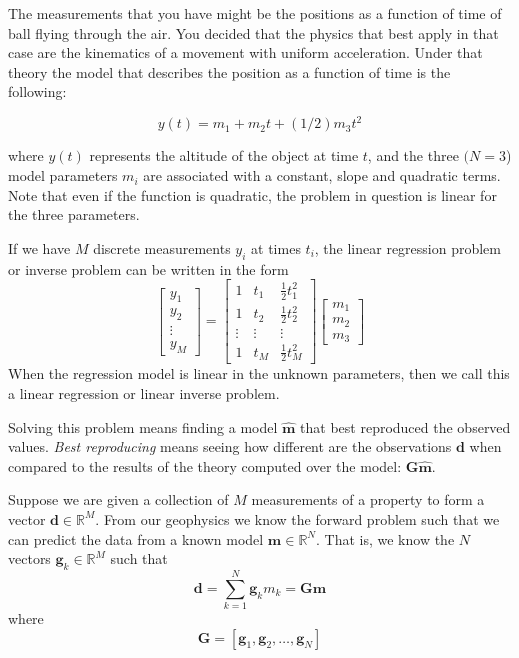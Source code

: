 \documentclass{article}
\newcommand{\real}{\mathbb{R}}
\begin{document}
The measurements that you have might be the positions as a function of time of ball flying through the air. You decided that the physics that best apply in that case are the kinematics of a movement with uniform acceleration. Under that theory the model that describes the position as a function of time is the following:

\begin{equation}
y(t) = m_1 + m_2 t + (1/2) m_3 t^2
\end{equation}

where $y(t)$ represents the altitude of the object at time $t$, and the three $(N=3$) model parameters $m_i$ are associated with a constant, slope and quadratic terms. Note that even if the function is quadratic, the problem in question is linear for the three parameters. 

If we have $M$ discrete measurements $y_i$ at times $t_i$, the linear regression problem or inverse problem can be written in the form
\begin{equation}
\left[
\begin{array}{c}
  y_1   \\
  y_2   \\
  \vdots \\
  y_M
\end{array}
\right] = 
\left[
\begin{array}{ccc}
  1 & t_1 & {\scriptstyle{\frac{1}{2}}}t_1^2 \\
  1  &t_2 &  {\scriptstyle{\frac{1}{2}}}t_2^2\\
  \vdots & \vdots  & \vdots\\
  1 & t_M &  {\scriptstyle{\frac{1}{2}}}t_M^2
\end{array}
\right]
\left[
\begin{array}{c}
  m_1   \\
  m_2    \\
  m_3
\end{array}
\right] 
\end{equation}
When the regression model is linear in the unknown parameters, then we call this a linear regression or linear inverse problem. 

Solving this problem means finding a model $\mathbf{\hat{m}}$ that best reproduced the observed values. \emph{Best reproducing} means seeing how different are the observations $\mathbf{d}$ when compared to the results of the theory computed over the model: $\mathbf{G} \mathbf{\hat{m}}$.

Suppose we are given a collection of $M$ measurements of a property to form a vector $\mathbf{d} \in \real^M$. From our geophysics we know the forward problem such that we can predict the data from a known model $\mathbf{m} \in \real^N$. That is, we know the $N$ vectors $\mathbf{g}_k \in \real^M$ such that 
\begin{equation}
\mathbf{d} = \sum_{k=1}^{N} \mathbf{g}_k m_k = \mathbf{G} \mathbf{m}
\end{equation}
where
\begin{equation}
\mathbf{G} = \left[ \mathbf{g}_1, \mathbf{g}_2, \dots, \mathbf{g}_N \right] 
\end{equation}
\end{document}
